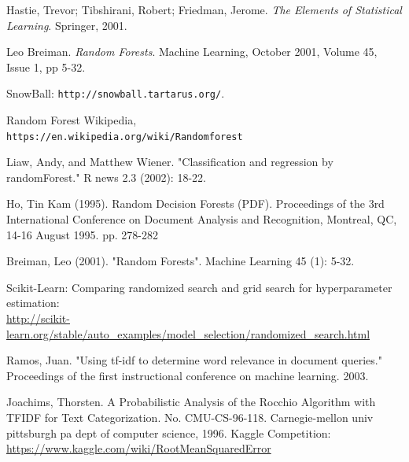 \documentclass{sig-alternate-05-2015}
\begin{document}
\begin{thebibliography}{9}
Hastie, Trevor; Tibshirani, Robert; Friedman, Jerome.
\textit{The Elements of Statistical Learning}. 
Springer, 2001.

 Leo Breiman.
\textit{Random Forests}. Machine Learning,
October 2001, Volume 45, Issue 1, pp 5-32.

SnowBall:
\texttt{http://snowball.tartarus.org/}. 
 
Random Forest Wikipedia,
\\\texttt{https://en.wikipedia.org/wiki/Random\underline{\hspace{.2cm}}forest}

Liaw, Andy, and Matthew Wiener. "Classification and regression by randomForest." R news 2.3 (2002): 18-22.

Ho, Tin Kam (1995). Random Decision Forests (PDF). Proceedings of the 3rd International Conference on Document Analysis and Recognition, Montreal, QC, 14-16 August 1995. pp. 278-282

Breiman, Leo (2001). "Random Forests". Machine Learning 45 (1): 5-32.

Scikit-Learn: Comparing randomized search and grid search for hyperparameter estimation:\\
\href{url}{http://scikit-learn.org/stable/auto\_examples/model\_selection/randomized\_search.html}

Ramos, Juan. "Using tf-idf to determine word relevance in document queries." Proceedings of the first instructional conference on machine learning. 2003.

Joachims, Thorsten. A Probabilistic Analysis of the Rocchio Algorithm with TFIDF for Text Categorization. No. CMU-CS-96-118. Carnegie-mellon univ pittsburgh pa dept of computer science, 1996.
Kaggle Competition: \href{url}{https://www.kaggle.com/wiki/RootMeanSquaredError}

\end{thebibliography}

%

\end{document}
